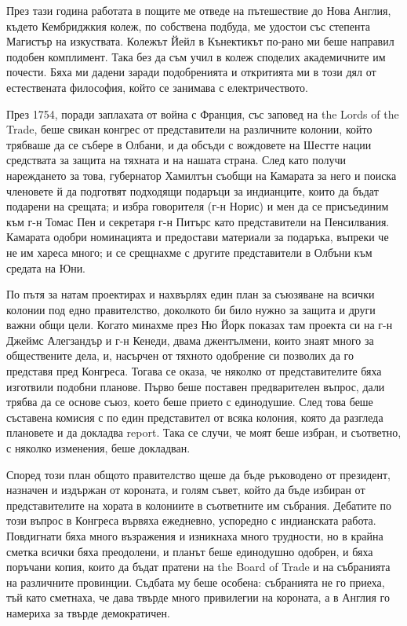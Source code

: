 \documentclass[12pt]{book}
\begin{document}
През тази година работата в пощите ме отведе на пътешествие до Нова Англия, където Кембриджкия колеж, по собствена подбуда, ме удостои със степента Магистър на изкуствата. Колежът Йейл в Кънектикът по-рано ми беше направил подобен комплимент. Така без да съм учил в колеж споделих академичните им почести. Бяха ми дадени заради подобренията и откритията ми в този дял от естествената философия, който се занимава с електричеството.

През 1754, поради заплахата от война с Франция, със заповед на the Lords of the Trade, беше свикан конгрес от представители на различните колонии, който трябваше да се събере в Олбани, и да обсъди с вождовете на Шестте нации средствата за защита на тяхната и на нашата страна. След като получи нареждането за това, губернатор Хамилтън съобщи на Камарата за него и поиска членовете й да подготвят подходящи подаръци за индианците, които да бъдат подарени на срещата; и избра говорителя (г-н Норис) и мен да се присъединим към г-н Томас Пен и секретаря г-н Питърс като представители на Пенсилвания. Камарата одобри номинацията и предостави материали за подаръка, въпреки че не им хареса много; и се срещнахме с другите представители в Олбъни към средата на Юни.

По пътя за натам проектирах и нахвърлях един план за съюзяване на всички колонии под едно правителство, доколкото би било нужно за защита и други важни общи цели. Когато минахме през Ню Йорк показах там проекта си на г-н Джеймс Алегзандър и г-н Кенеди, двама джентълмени, които знаят много за обществените дела, и, насърчен от тяхното одобрение си позволих да го представя пред Конгреса. Тогава се оказа, че няколко от представителите бяха изготвили подобни планове. Първо беше поставен предварителен въпрос, дали трябва да се основе съюз, което беше прието с единодушие. След това беше съставена комисия с по един представител от всяка колония, която да разгледа плановете и да докладва report. Така се случи, че моят беше избран, и съответно, с няколко изменения, беше докладван.

Според този план общото правителство щеше да бъде ръководено от президент, назначен и издържан от короната, и голям съвет, който да бъде избиран от представителите на хората в колониите в съответните им събрания. Дебатите по този въпрос в Конгреса вървяха ежедневно, успоредно с индианската работа. Повдигнати бяха много възражения и изникнаха много трудности, но в крайна сметка всички бяха преодолени, и планът беше единодушно одобрен, и бяха поръчани копия, които да бъдат пратени на the Board of Trade и на събранията на различните провинции. Съдбата му беше особена: събранията не го приеха, тъй като сметнаха, че дава твърде много привилегии на короната, а в Англия го намериха за твърде демократичен. 
\end{document}
